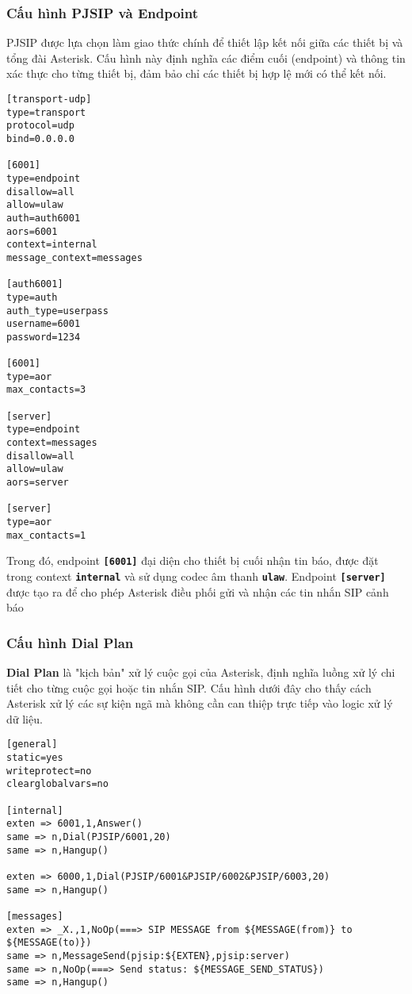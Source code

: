 \subsubsection{Cấu hình PJSIP và Endpoint}

PJSIP được lựa chọn làm giao thức chính để thiết lập kết nối giữa các thiết bị và tổng đài Asterisk. Cấu hình này định nghĩa các điểm cuối (endpoint) và thông tin xác thực cho từng thiết bị, đảm bảo chỉ các thiết bị hợp lệ mới có thể kết nối.

\begin{verbatim}
[transport-udp]
type=transport
protocol=udp
bind=0.0.0.0

[6001]
type=endpoint
disallow=all
allow=ulaw
auth=auth6001
aors=6001
context=internal
message_context=messages

[auth6001]
type=auth
auth_type=userpass
username=6001
password=1234

[6001]
type=aor
max_contacts=3

[server]
type=endpoint
context=messages
disallow=all
allow=ulaw
aors=server

[server]
type=aor
max_contacts=1
\end{verbatim}

Trong đó, endpoint \textbf{\texttt{[6001]}} đại diện cho thiết bị cuối nhận tin báo, được đặt trong context \textbf{\texttt{internal}} và sử dụng codec âm thanh \textbf{\texttt{ulaw}}. Endpoint \textbf{\texttt{[server]}} được tạo ra để cho phép Asterisk điều phối gửi và nhận các tin nhắn SIP cảnh báo
\subsubsection{Cấu hình Dial Plan}

\textbf{Dial Plan} là "kịch bản" xử lý cuộc gọi của Asterisk, định nghĩa luồng xử lý chi tiết cho từng cuộc gọi hoặc tin nhắn SIP. Cấu hình dưới đây cho thấy cách Asterisk xử lý các sự kiện ngã mà không cần can thiệp trực tiếp vào logic xử lý dữ liệu.

\begin{verbatim}
[general]
static=yes
writeprotect=no
clearglobalvars=no

[internal]
exten => 6001,1,Answer()
same => n,Dial(PJSIP/6001,20)
same => n,Hangup()

exten => 6000,1,Dial(PJSIP/6001&PJSIP/6002&PJSIP/6003,20)
same => n,Hangup()

[messages]
exten => _X.,1,NoOp(===> SIP MESSAGE from ${MESSAGE(from)} to ${MESSAGE(to)})
same => n,MessageSend(pjsip:${EXTEN},pjsip:server)
same => n,NoOp(===> Send status: ${MESSAGE_SEND_STATUS})
same => n,Hangup()
\end{verbatim}

